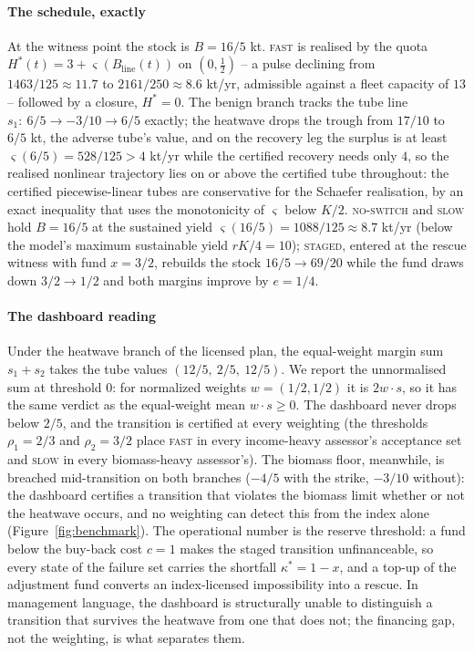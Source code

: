 \documentclass[preprint,11pt,authoryear]{elsarticle}
\theoremstyle{definition}
\theoremstyle{remark}
\newcommand{\act}[1]{\textsc{#1}}
\begin{document}
\paragraph{The schedule, exactly} At the witness point the stock is $B=16/5$ kt. \act{fast} is realised by the quota $H^*(t)=3+\varsigma(B_{\mathrm{line}}(t))$ on $(0,\tfrac12)$ -- a pulse declining from $1463/125\approx11.7$ to $2161/250\approx8.6$ kt/yr, admissible against a fleet capacity of $13$ -- followed by a closure, $H^*=0$. The benign branch tracks the tube line $s_1:\ 6/5\to-3/10\to6/5$ exactly; the heatwave drops the trough from $17/10$ to $6/5$ kt, the adverse tube's value, and on the recovery leg the surplus is at least $\varsigma(6/5)=528/125>4$ kt/yr while the certified recovery needs only $4$, so the realised nonlinear trajectory lies on or above the certified tube throughout: the certified piecewise-linear tubes are conservative for the Schaefer realisation, by an exact inequality that uses the monotonicity of $\varsigma$ below $K/2$. \act{no-switch} and \act{slow} hold $B=16/5$ at the sustained yield $\varsigma(16/5)=1088/125\approx8.7$ kt/yr (below the model's maximum sustainable yield $rK/4=10$); \act{staged}, entered at the rescue witness with fund $x=3/2$, rebuilds the stock $16/5\to69/20$ while the fund draws down $3/2\to1/2$ and both margins improve by $e=1/4$.

\paragraph{The dashboard reading} Under the heatwave branch of the licensed plan, the equal-weight margin sum $s_1+s_2$ takes the tube values $(12/5,\ 2/5,\ 12/5)$. We report the unnormalised sum at threshold $0$: for normalized weights $w=(1/2,1/2)$ it is $2w\cdot s$, so it has the same verdict as the equal-weight mean $w\cdot s\ge0$. The dashboard never drops below $2/5$, and the transition is certified at every weighting (the thresholds $\rho_1=2/3$ and $\rho_2=3/2$ place \act{fast} in every income-heavy assessor's acceptance set and \act{slow} in every biomass-heavy assessor's). The biomass floor, meanwhile, is breached mid-transition on both branches ($-4/5$ with the strike, $-3/10$ without): the dashboard certifies a transition that violates the biomass limit whether or not the heatwave occurs, and no weighting can detect this from the index alone (Figure~\ref{fig:benchmark}). The operational number is the reserve threshold: a fund below the buy-back cost $c=1$ makes the staged transition unfinanceable, so every state of the failure set carries the shortfall $\kappa^*=1-x$, and a top-up of the adjustment fund converts an index-licensed impossibility into a rescue. In management language, the dashboard is structurally unable to distinguish a transition that survives the heatwave from one that does not; the financing gap, not the weighting, is what separates them.
\end{document}
